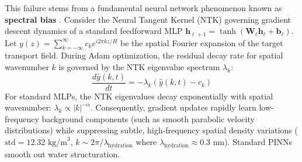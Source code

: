 \documentclass[3p,preprint,12pt,numbers,square,sort&compress]{elsarticle}
\begin{document}
This failure stems from a fundamental neural network phenomenon known as \textbf{spectral bias} \cite{moseley2023, lu2021deepxde}. Consider the Neural Tangent Kernel (NTK) governing gradient descent dynamics of a standard feedforward MLP $\mathbf{h}_{\ell+1} = \tanh(\mathbf{W}_\ell \mathbf{h}_\ell + \mathbf{b}_\ell)$. Let $y(z) = \sum_{k=-\infty}^{\infty} c_k e^{i 2\pi k z / H}$ be the spatial Fourier expansion of the target transport field. During Adam optimization, the residual decay rate for spatial wavenumber $k$ is governed by the NTK eigenvalue spectrum $\lambda_k$:
\begin{equation}
    \frac{d \hat{y}(k, t)}{dt} = -\lambda_k \left( \hat{y}(k, t) - c_k \right)
    \label{eq:ntk_decay}
\end{equation}
For standard MLPs, the NTK eigenvalues decay exponentially with spatial wavenumber: $\lambda_k \propto |k|^{-\alpha}$. Consequently, gradient updates rapidly learn low-frequency background components (such as smooth parabolic velocity distributions) while suppressing subtle, high-frequency spatial density variations ($\text{std} = 12.32\text{ kg/m}^3$, $k \sim 2\pi / \lambda_{\text{hydration}}$ where $\lambda_{\text{hydration}} \approx 0.3\text{ nm}$). Standard PINNs smooth out water structuration.
\end{document}
